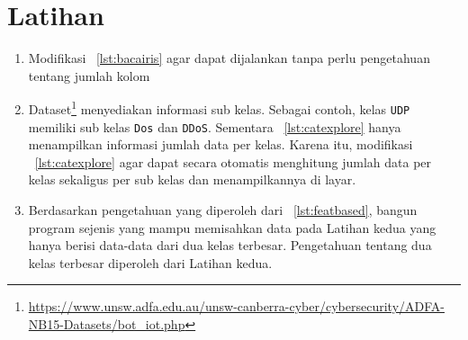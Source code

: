 \section{Latihan}
\begin{enumerate}
  \item Modifikasi \lstlistingname~\ref{lst:bacairis} agar dapat dijalankan tanpa perlu pengetahuan tentang jumlah kolom
  \item Dataset\footnote{\url{https://www.unsw.adfa.edu.au/unsw-canberra-cyber/cybersecurity/ADFA-NB15-Datasets/bot\_iot.php}} menyediakan informasi sub kelas. Sebagai contoh, kelas \texttt{UDP} memiliki sub kelas \texttt{Dos} dan \texttt{DDoS}. Sementara \lstlistingname~\ref{lst:catexplore} hanya menampilkan informasi jumlah data per kelas. Karena itu, modifikasi \lstlistingname~\ref{lst:catexplore} agar dapat secara otomatis menghitung jumlah data per kelas sekaligus per sub kelas dan menampilkannya di layar.
  \item Berdasarkan pengetahuan yang diperoleh dari \lstlistingname~\ref{lst:featbased}, bangun program sejenis yang mampu memisahkan data pada Latihan kedua yang hanya berisi data-data dari dua kelas terbesar. Pengetahuan tentang dua kelas terbesar diperoleh dari Latihan kedua.
\end{enumerate}
